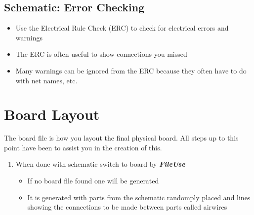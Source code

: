 \documentclass{article}
\begin{document}
\subsection{Schematic: Error Checking}
\begin{itemize}
    \item Use the Electrical Rule Check (ERC) to check for electrical errors
    and warnings
    \item The ERC is often useful to show connections you missed
    \item Many warnings can be ignored from the ERC because they often have to
    do with net names, etc.
\end{itemize}

\section{Board Layout}
The board file is how you layout the final physical board. All steps up to this
point have been to assist you in the creation of this.
\begin{enumerate}
    \item When done with schematic switch to board by
    \textit{\textbf{File\textrightarrow Use}}
    \begin{itemize}
        \item If no board file found one will be generated
        \item It is generated with parts from the schematic randomply placed and
        lines showing the connections to be made between parts called airwires
    \end{itemize}
\end{enumerate}
\end{document}
